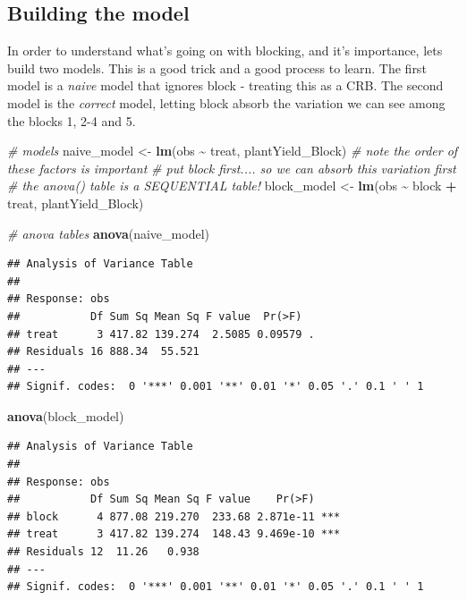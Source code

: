 \documentclass[
]{book}
\newenvironment{Shaded}{\begin{snugshade}}{\end{snugshade}}
\newcommand{\CommentTok}[1]{\textcolor[rgb]{0.56,0.35,0.01}{\textit{#1}}}
\newcommand{\FunctionTok}[1]{\textcolor[rgb]{0.13,0.29,0.53}{\textbf{#1}}}
\newcommand{\NormalTok}[1]{#1}
\newcommand{\OtherTok}[1]{\textcolor[rgb]{0.56,0.35,0.01}{#1}}
\newcommand{\SpecialCharTok}[1]{\textcolor[rgb]{0.81,0.36,0.00}{\textbf{#1}}}
\begin{document}
\hypertarget{building-the-model}{%
\subsection{Building the model}\label{building-the-model}}

In order to understand what's going on with blocking, and it's importance, lets build two models. This is a good trick and a good process to learn. The first model is a \emph{naive} model that ignores block - treating this as a CRB. The second model is the \emph{correct} model, letting block absorb the variation we can see among the blocks 1, 2-4 and 5.

\begin{Shaded}
\begin{Highlighting}[]
\CommentTok{\# models}
\NormalTok{naive\_model }\OtherTok{\textless{}{-}} \FunctionTok{lm}\NormalTok{(obs }\SpecialCharTok{\textasciitilde{}}\NormalTok{ treat, plantYield\_Block)}
\CommentTok{\# note the order of these factors is important}
\CommentTok{\# put block first.... so we can absorb this variation first}
\CommentTok{\# the anova() table is a SEQUENTIAL table!}
\NormalTok{block\_model }\OtherTok{\textless{}{-}} \FunctionTok{lm}\NormalTok{(obs }\SpecialCharTok{\textasciitilde{}}\NormalTok{ block }\SpecialCharTok{+}\NormalTok{ treat, plantYield\_Block) }

\CommentTok{\# anova tables}
\FunctionTok{anova}\NormalTok{(naive\_model)}
\end{Highlighting}
\end{Shaded}

\begin{verbatim}
## Analysis of Variance Table
## 
## Response: obs
##           Df Sum Sq Mean Sq F value  Pr(>F)  
## treat      3 417.82 139.274  2.5085 0.09579 .
## Residuals 16 888.34  55.521                  
## ---
## Signif. codes:  0 '***' 0.001 '**' 0.01 '*' 0.05 '.' 0.1 ' ' 1
\end{verbatim}

\begin{Shaded}
\begin{Highlighting}[]
\FunctionTok{anova}\NormalTok{(block\_model)}
\end{Highlighting}
\end{Shaded}

\begin{verbatim}
## Analysis of Variance Table
## 
## Response: obs
##           Df Sum Sq Mean Sq F value    Pr(>F)    
## block      4 877.08 219.270  233.68 2.871e-11 ***
## treat      3 417.82 139.274  148.43 9.469e-10 ***
## Residuals 12  11.26   0.938                      
## ---
## Signif. codes:  0 '***' 0.001 '**' 0.01 '*' 0.05 '.' 0.1 ' ' 1
\end{verbatim}
\end{document}
